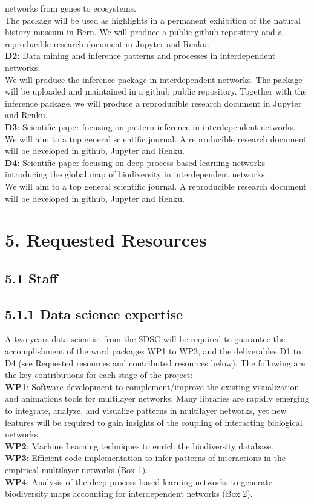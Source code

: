 \documentclass[11pt]{article}
\begin{document}
networks from genes to ecosystems.\\
The package will be used as highlights in a permanent exhibition of the natural
history museum in Bern. We will produce a public github repository and a
reproducible research document in Jupyter and Renku.\\
{\bf D2}: Data mining and inference patterns and processes in interdependent networks.\\
We will produce the inference package in interdependent networks. The package will
be uploaded and maintained in a github public repository. Together with the inference
package, we will produce a reproducible research document in Jupyter and Renku.\\
{\bf D3}: Scientific paper focusing on pattern inference in interdependent networks.\\
We will aim to a top general scientific journal. A reproducible research document
will be developed in github, Jupyter and Renku.\\
{\bf D4}: Scientific paper focusing on deep process-based learning networks introducing the global map of biodiversity in interdependent networks.\\
We will aim to a top general scientific journal. A reproducible research document
will be developed in github, Jupyter and Renku.

\section*{5. Requested Resources}

\subsection*{5.1 Staff}

\subsection*{5.1.1 Data science expertise}
A two years data scientist from the SDSC will be required to guarantee
the accomplishment of the word packages WP1 to WP3, and the
deliverables D1 to D4 (see Requested resources and contributed
resources below). The following are the key contributions for each
stage of the project:
\\
{\bf WP1}: Software development to complement/improve the existing
visualization and animations tools for multilayer networks. Many
libraries are rapidly emerging to integrate, analyze, and visualize
patterns in multilayer networks, yet new features
will be required to gain insights of the coupling of interacting biological networks.\\
{\bf WP2}: Machine Learning techniques to enrich the biodiversity database.\\
{\bf WP3}: Efficient code implementation to infer patterns of interactions in the empirical multilayer networks (Box 1).\\
{\bf WP4}: Analysis of the deep process-based learning networks to generate biodiversity maps accounting for interdependent networks (Box 2).\\
\end{document}
